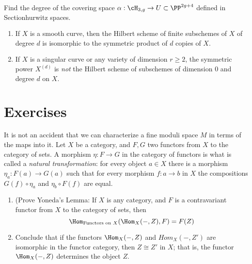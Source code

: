 \begin{exercise}
Find the degree of the covering space $\alpha : \cH_{3,g} \to U \subset \PP^{2g+4}$
defined in Section{hurwitz spaces}.
\end{exercise}

\begin{exercise}\label{symmetric power vs Hilbert scheme}
\begin{enumerate}
 \item If $X$ is a smooth curve, then the Hilbert scheme of finite subschemes of $X$ of degree $d$ is
 isomorphic to the symmetric product of $d$ copies of $X$.
 \item If $X$ is a singular curve or any variety of dimension $r \geq 2$, the symmetric power $X^{(d)}$ is \emph{not} the Hilbert scheme of subschemes of dimension 0 and degree $d$ on $X$. 
 
\end{enumerate}
 \end{exercise}

\section{Exercises}
\begin{exercise}
It is not an accident that we can characterize a fine moduli space $M$ in terms of the maps into it. 
 Let $X$ be a category, and $F,G$ two functors from $X$ to the category of sets.
 A morphism $\eta: F\to G$ in the category of functors is what is called a \emph{natural transformation}:
 for every object $a\in X$ there is a morphism $\eta_a:F(a) \to G(a)$ such that for every
 morphism $f: a\to b$ in $X$ the compositions $G(f)\circ \eta_a$ and $\eta_b\circ F(f)$
 are equal. 
\begin{enumerate}
 \item (Prove Yoneda's Lemma: If $X$ is any category, and $F$ is a contravariant functor from $X$ to the category of sets, then 
 $$
 \Hom_{\hbox{\scriptsize Functors on $X$}}(\Hom_X( -, Z), F) = F(Z)
 $$
 \item Conclude that if the functors $\Hom_X( -, Z)$ and $Hom_X( -, Z')$ are isomorphic in the functor category, 
 then $Z \cong Z'$ in $X$; that is, the functor $\Hom_X( -, Z)$ determines the object $Z$.
 \end{enumerate}
\end{exercise}

